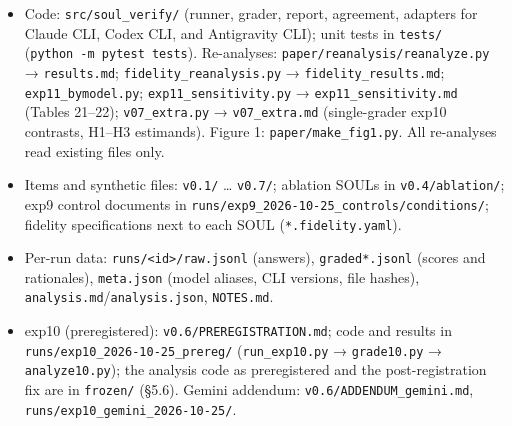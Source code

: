 \documentclass[10pt]{article}
\providecommand{\tightlist}{\setlength{\itemsep}{0pt}\setlength{\parskip}{0pt}}
\begin{document}
\begin{itemize}
\tightlist
\item
  Code: \texttt{src/\allowbreak{}soul\_\allowbreak{}verify/\allowbreak{}} (runner, grader, report, agreement, adapters for Claude CLI, Codex CLI, and Antigravity CLI); unit tests in \texttt{tests/\allowbreak{}} (\texttt{python\ -\allowbreak{}m\ pytest\ tests}). Re-analyses: \texttt{paper/\allowbreak{}reanalysis/\allowbreak{}reanalyze.\allowbreak{}py} → \texttt{results.\allowbreak{}md}; \texttt{fidelity\_\allowbreak{}reanalysis.\allowbreak{}py} → \texttt{fidelity\_\allowbreak{}results.\allowbreak{}md}; \texttt{exp11\_\allowbreak{}bymodel.\allowbreak{}py}; \texttt{exp11\_\allowbreak{}sensitivity.\allowbreak{}py} → \texttt{exp11\_\allowbreak{}sensitivity.\allowbreak{}md} (Tables 21--22); \texttt{v07\_\allowbreak{}extra.\allowbreak{}py} → \texttt{v07\_\allowbreak{}extra.\allowbreak{}md} (single-grader exp10 contrasts, H1--H3 estimands). Figure 1: \texttt{paper/\allowbreak{}make\_\allowbreak{}fig1.\allowbreak{}py}. All re-analyses read existing files only.
\item
  Items and synthetic files: \texttt{v0.\allowbreak{}1/\allowbreak{}} \ldots{} \texttt{v0.\allowbreak{}7/\allowbreak{}}; ablation SOULs in \texttt{v0.\allowbreak{}4/\allowbreak{}ablation/\allowbreak{}}; exp9 control documents in \texttt{runs/\allowbreak{}exp9\_\allowbreak{}2026-\allowbreak{}10-\allowbreak{}25\_\allowbreak{}controls/\allowbreak{}conditions/\allowbreak{}}; fidelity specifications next to each SOUL (\texttt{*.\allowbreak{}fidelity.\allowbreak{}yaml}).
\item
  Per-run data: \texttt{runs/\allowbreak{}\textless{}id\textgreater{}/\allowbreak{}raw.\allowbreak{}jsonl} (answers), \texttt{graded*.\allowbreak{}jsonl} (scores and rationales), \texttt{meta.\allowbreak{}json} (model aliases, CLI versions, file hashes), \texttt{analysis.\allowbreak{}md}/\texttt{analysis.\allowbreak{}json}, \texttt{NOTES.\allowbreak{}md}.
\item
  exp10 (preregistered): \texttt{v0.\allowbreak{}6/\allowbreak{}PREREGISTRATION.\allowbreak{}md}; code and results in \texttt{runs/\allowbreak{}exp10\_\allowbreak{}2026-\allowbreak{}10-\allowbreak{}25\_\allowbreak{}prereg/\allowbreak{}} (\texttt{run\_\allowbreak{}exp10.\allowbreak{}py} → \texttt{grade10.\allowbreak{}py} → \texttt{analyze10.\allowbreak{}py}); the analysis code as preregistered and the post-registration fix are in \texttt{frozen/\allowbreak{}} (§5.6). Gemini addendum: \texttt{v0.\allowbreak{}6/\allowbreak{}ADDENDUM\_\allowbreak{}gemini.\allowbreak{}md}, \texttt{runs/\allowbreak{}exp10\_\allowbreak{}gemini\_\allowbreak{}2026-\allowbreak{}10-\allowbreak{}25/\allowbreak{}}.

\end{itemize}
\end{document}
